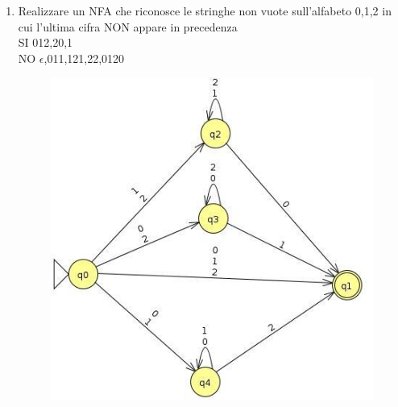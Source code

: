 \documentclass[12pt]{article}
\begin{document}
\begin{enumerate}
\newpage
\item Realizzare un NFA che riconosce le stringhe non vuote sull'alfabeto {0,1,2} in cui l'ultima cifra NON appare in precedenza
\\
SI 012,20,1
\\
NO $\epsilon$,011,121,22,0120

\begin{figure}[h]
  \includegraphics[scale = 0.5]{media/es10.jpg}
  \centering
\end{figure}

\end{enumerate}
\end{document}
